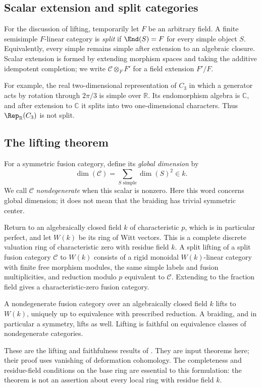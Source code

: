 \subsection{Scalar extension and split categories}
For the discussion of lifting, temporarily let $F$ be an arbitrary field.
A finite semisimple $F$-linear category is \emph{split} if
$\End(S)=F$ for every simple object $S$. Equivalently, every simple remains
simple after extension to an algebraic closure. Scalar extension is formed
by extending morphism spaces and taking the additive idempotent completion;
we write $\mathcal C\otimes_F F'$ for a field extension $F'/F$.

For example, the real two-dimensional representation of $C_3$ in which a
generator acts by rotation through $2\pi/3$ is simple over $\mathbb R$.
Its endomorphism algebra is $\mathbb C$, and after extension to $\mathbb C$
it splits into two one-dimensional characters. Thus $\Rep_{\mathbb R}(C_3)$
is not split.

\subsection{The lifting theorem}
For a symmetric fusion category, define its \emph{global dimension} by
\[
 \dim(\mathcal C)=\sum_{S\text{ simple}}\dim(S)^2\in k.
\]
We call $\mathcal C$ \emph{nondegenerate} when this scalar is nonzero.
Here this word concerns global dimension; it does not mean that the
braiding has trivial symmetric center.

Return to an algebraically closed field $k$ of characteristic $p$, which
is in particular perfect, and let $W(k)$ be its ring of
Witt vectors. This is a complete discrete valuation ring of characteristic
zero with residue field $k$. A split lifting of a split fusion category
$\mathcal C$ to $W(k)$ consists of a rigid monoidal $W(k)$-linear category
with finite free morphism modules, the same simple labels and fusion
multiplicities, and reduction modulo $p$ equivalent to $\mathcal C$.
Extending to the fraction field gives a characteristic-zero fusion category.

\begin{theorem}
\label{lec20-lifting}
A nondegenerate fusion category over an algebraically closed field $k$ lifts to
$W(k)$, uniquely up to equivalence with prescribed reduction. A braiding,
and in particular a symmetry, lifts as well. Lifting is faithful on
equivalence classes of nondegenerate categories.
\end{theorem}
These are the lifting and faithfulness results of \cite[Section 9]{ENO}.
They are input theorems here; their proof uses vanishing of deformation
cohomology. The completeness and residue-field conditions on the base ring
are essential to this formulation: the theorem is not an assertion about
every local ring with residue field $k$.
